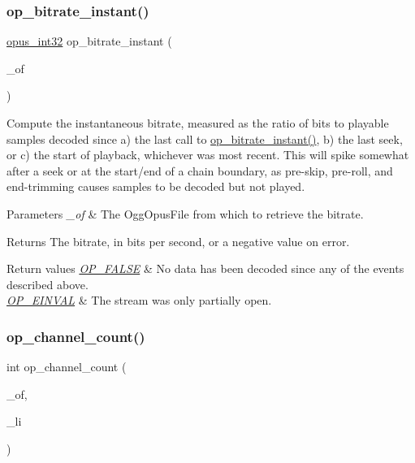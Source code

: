 \subsubsection{\texorpdfstring{op\+\_\+bitrate\+\_\+instant()}{op\_bitrate\_instant()}}
{\footnotesize\ttfamily \hyperlink{opus__types_8h_aa4d309d6f80b99dbabebc8f98879ab9a}{opus\+\_\+int32} op\+\_\+bitrate\+\_\+instant (\begin{DoxyParamCaption}\item[{Ogg\+Opus\+File $\ast$}]{\+\_\+of }\end{DoxyParamCaption})}

Compute the instantaneous bitrate, measured as the ratio of bits to playable samples decoded since a) the last call to \hyperlink{group__stream__info_ga7e9e871615055673d5e3c7b4c1dfce80}{op\+\_\+bitrate\+\_\+instant()}, b) the last seek, or c) the start of playback, whichever was most recent. This will spike somewhat after a seek or at the start/end of a chain boundary, as pre-\/skip, pre-\/roll, and end-\/trimming causes samples to be decoded but not played. 
\begin{DoxyParams}{Parameters}
{\em \+\_\+of} & The {\ttfamily Ogg\+Opus\+File} from which to retrieve the bitrate. \\
\hline
\end{DoxyParams}
\begin{DoxyReturn}{Returns}
The bitrate, in bits per second, or a negative value on error. 
\end{DoxyReturn}

\begin{DoxyRetVals}{Return values}
{\em \hyperlink{group__error__codes_ga4fd28e64a5cbe5e0ba163916199611a5}{O\+P\+\_\+\+F\+A\+L\+SE}} & No data has been decoded since any of the events described above. \\
\hline
{\em \hyperlink{group__error__codes_gae0879acafe9cc0ab72462d291fdb6fb6}{O\+P\+\_\+\+E\+I\+N\+V\+AL}} & The stream was only partially open. \\
\hline
\end{DoxyRetVals}
\mbox{\label{group__stream__info_ga42c829e67c0ce8359bfbfc31a45c04f4}} 
\subsubsection{\texorpdfstring{op\+\_\+channel\+\_\+count()}{op\_channel\_count()}}
{\footnotesize\ttfamily int op\+\_\+channel\+\_\+count (\begin{DoxyParamCaption}\item[{\hyperlink{zconf_8h_a2c212835823e3c54a8ab6d95c652660e}{const} Ogg\+Opus\+File $\ast$}]{\+\_\+of,  }\item[{int}]{\+\_\+li }\end{DoxyParamCaption})}

